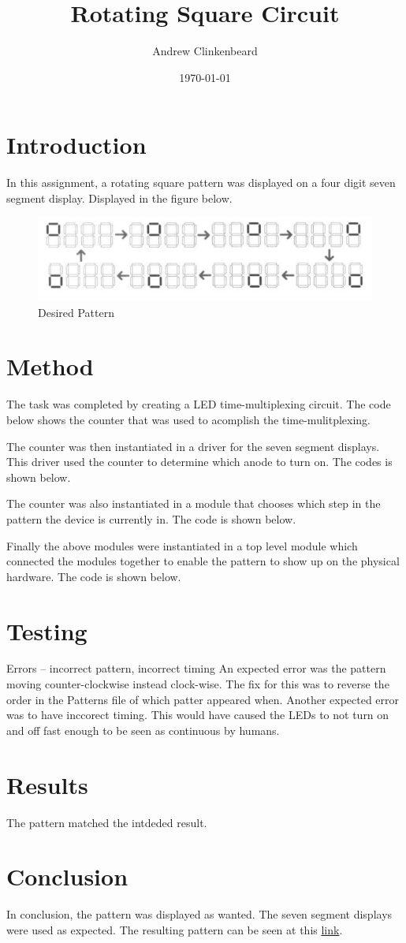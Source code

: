 \documentclass[11pt]{article}
\title{Rotating Square Circuit}
\author{Andrew Clinkenbeard}
\date{\today}
\newcommand{\Verilog}[2][]{%
	
}
\begin{document}
\maketitle
\section{Introduction}

In this assignment, a rotating square pattern was displayed on a four digit seven segment display. Displayed in the figure below.



\begin{figure}[h]\centering
	\includegraphics[width=\textwidth,trim=0cm 0cm 0cm 0cm,clip]{figure1}
	\caption{Desired Pattern}
	\label{Desired Pattern}			%
\end{figure}


\section{Method}
The task was completed by creating a LED time-multiplexing circuit. The code below shows the counter that was used to acomplish the time-mulitplexing. 
\Verilog[firstline=23]{./mysseg.srcs/sources_1/new/counter.sv}

The counter was then instantiated in a driver for the seven segment displays. This driver used the counter to determine which anode to turn on. The codes is shown below.
\Verilog[firstline=23]{./mysseg.srcs/sources_1/new/ssegdriver.sv}
The counter was also instantiated in a module that chooses which step in the pattern the device is currently in. The code is shown below.
\Verilog[firstline=23]{./mysseg.srcs/sources_1/new/Patterns.sv}
Finally the above modules were instantiated in a top level module which connected the modules together to enable the pattern to show up on the physical hardware. The code is shown below.
\Verilog[firstline=23]{./mysseg.srcs/sources_1/new/ssegmain.sv}

\section{Testing}
Errors -- incorrect pattern, incorrect timing
An expected error was the pattern moving counter-clockwise instead clock-wise. The fix for this was to reverse the order in the Patterns file of which patter appeared when.
Another expected error was to have inccorect timing. This would have caused the LEDs to not turn on and off fast enough to be seen as continuous by humans.


\section{Results}
The pattern matched the intdeded result.

\section{Conclusion}
In conclusion, the pattern was displayed as wanted. The seven segment displays were used as expected. The resulting pattern can be seen at this \href{https://www.youtube.com/watch?v=FZpEwH8YCFI}{link}.
\end{document}
